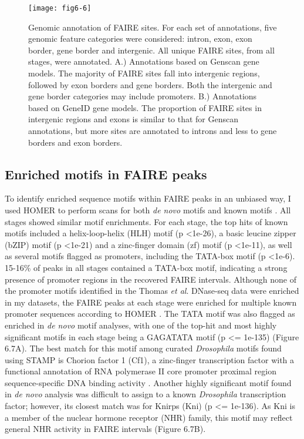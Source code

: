 \begin{figure}
\centering
\texttt{[image: fig6-6]}
\caption[Genomic annotation of FAIRE sites]{Genomic annotation of FAIRE sites. For each set of annotations, five genomic feature categories were considered: intron, exon, exon border, gene border and intergenic. All unique FAIRE sites, from all stages, were annotated. A.) Annotations based on Genscan gene models. The majority of FAIRE sites fall into intergenic regions, followed by exon borders and gene borders. Both the intergenic and gene border categories may include promoters. B.) Annotations based on GeneID gene models. The proportion of FAIRE sites in intergenic regions and exons is similar to that for Genscan annotations, but more sites are annotated to introns and less to gene borders and exon borders.}
\label{Figure 6.6}
\end{figure}

\subsection{Enriched motifs in FAIRE peaks}
To identify enriched sequence motifs within FAIRE peaks in an unbiased way, I used HOMER to perform scans for both \emph{de novo} motifs and known motifs \citep{heinz_simple_2010}. All stages showed similar motif enrichments. For each stage, the top hits of known motifs included a helix-loop-helix (HLH) motif (p \textless 1e-26), a basic leucine zipper (bZIP) motif (p \textless 1e-21) and a zinc-finger domain (zf) motif (p \textless 1e-11), as well as several motifs flagged as promoters, including the TATA-box motif (p \textless 1e-6). 15-16\% of peaks in all stages contained a TATA-box motif, indicating a strong presence of promoter regions in the recovered FAIRE intervals. Although none of the promoter motifs identified in the Thomas \emph{et al}. DNase-seq data were enriched in my datasets, the FAIRE peaks at each stage were enriched for multiple known promoter sequences according to HOMER \citep{thomas_dynamic_2011}. The TATA motif was also flagged as enriched in \emph{de novo} motif analyses, with one of the top-hit and most highly significant motifs in each stage being a GAGATATA motif (p \textless= 1e-135) (Figure 6.7A). The best match for this motif among curated \emph{Drosophila} motifs found using STAMP is Chorion factor 1 (Cf1), a zinc-finger transcription factor with a functional annotation of RNA polymerase II core promoter proximal region sequence-specific DNA binding activity \citep{mahony_stamp:_2007}. Another highly significant motif found in \emph{de novo} analysis was difficult to assign to a known \emph{Drosophila} transcription factor; however, its closest match was for Knirps (Kni) (p \textless= 1e-136). As Kni is a member of the nuclear hormone receptor (NHR) family, this motif may reflect general NHR activity in FAIRE intervals (Figure 6.7B).

